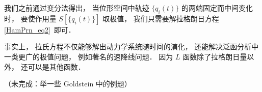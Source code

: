 
\begin{issues}
\issueDraft
\end{issues}


我们之前通过变分法得出， 当位形空间中轨迹 $\{q_i(t)\}$ 的两端固定而中间变化时， 要使作用量 $S[\{q_i(t)\}]$ 取极值， 我们只需要解拉格朗日方程\autoref{HamPrn_eq2}~即可．

事实上， 拉氏方程不仅能够解出动力学系统随时间的演化， 还能解决泛函分析中一类更广的极值问题， 例如著名的速降线问题． 因为 $L$ 函数除了拉格朗日量以外， 还可以是其他函数．

（未完成：举一些 Goldstein 中的例题）

